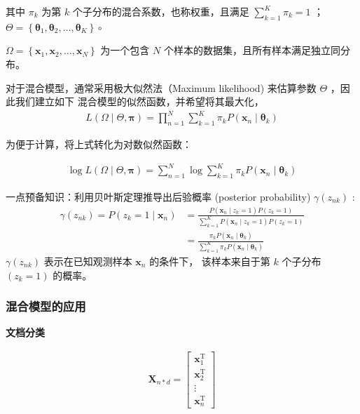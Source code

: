 \documentclass[UTF8]{ctexart}
\begin{document}
其中 $\pi_{k}$ 为第 $k$ 个子分布的混合系数，也称权重，且满足
$\sum_{k=1}^{K} \pi_{k}=1$ ； $\Theta=\left\{\boldsymbol{\theta}_{1}, \boldsymbol{\theta}_{2}, \ldots, \boldsymbol{\theta}_{K}\right\} \circ$

$\Omega=\left\{\boldsymbol{x}_{1}, \boldsymbol{x}_{2}, \ldots, \boldsymbol{x}_{N}\right\}$ 
为一个包含 $N$ 个样本的数据集，且所有样本满足独立同分布。

对于混合模型，通常采用极大似然法（Maximum likelihood) 来估算参数 $\Theta$ ，因此我们建立如下
混合模型的似然函数，并希望将其最大化，
$$
\begin{aligned}
L(\Omega \mid \Theta, \boldsymbol{\pi})=\prod_{n=1}^{N} \sum_{k=1}^{K} \pi_{k} P\left(\boldsymbol{x}_{n} \mid \boldsymbol{\theta}_{k}\right)
\end{aligned}
$$

为便于计算，将上式转化为对数似然函数：

$$
\begin{aligned}
\log L(\Omega \mid \Theta, \boldsymbol{\pi})=\sum_{n=1}^{N} \log \sum_{k=1}^{K} \pi_{k} P\left(\boldsymbol{x}_{n} \mid \boldsymbol{\theta}_{k}\right)
\end{aligned}
$$

一点预备知识：利用贝叶斯定理推导出后验概率 (posterior probability) 
$\gamma\left(z_{n k}\right)$ :
$$
\begin{aligned}
\gamma\left(z_{n k}\right)=P\left(z_{k}=1 \mid \boldsymbol{x}_{n}\right) &=\frac{P\left(\boldsymbol{x}_{n} \mid z_{k}=1\right) P\left(z_{k}=1\right)}{\sum_{k=1}^{K} P\left(\boldsymbol{x}_{n} \mid z_{k}=1\right) P\left(z_{k}=1\right)} \\
&=\frac{\pi_{k} P\left(\boldsymbol{x}_{n} \mid \boldsymbol{\theta}_{k}\right)}{\sum_{k=1}^{K} \pi_{k} P\left(\boldsymbol{x}_{n} \mid \boldsymbol{\theta}_{k}\right)}
\end{aligned}
$$
$\gamma\left(z_{n k}\right)$ 表示在已知观测样本 $\boldsymbol{x}_{n}$ 的条件下，
该样本来自于第 $k$ 个子分布 $\left(z_{k}=1\right)$ 的概率。

\subsubsection{混合模型的应用}

\textbf{文档分类} 


$$
\begin{aligned}
\boldsymbol{X}_{n*d}=\left[\begin{array}{c}
    \boldsymbol{x}_{1}^{\mathrm{T}} \\
    \boldsymbol{x}_{2}^{\mathrm{T}} \\
    \vdots \\
    \boldsymbol{x}_{n}^{\mathrm{T}}
    \end{array}\right]
\end{aligned}
$$
\end{document}
